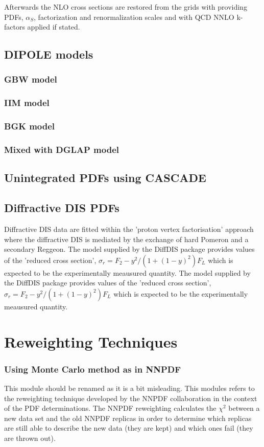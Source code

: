 \documentclass[11pt,a4paper]{article}
\begin{document}
Afterwards the NLO cross sections are restored from the grids
with providing PDFs, \(\alpha_S\), factorization and 
renormalization scales and with QCD NNLO k-factors applied
if stated.

\subsection{DIPOLE models}
\subsubsection{GBW model}
\subsubsection{IIM model}
\subsubsection{BGK model}
\subsubsection{Mixed with DGLAP model}
\subsection{Unintegrated PDFs using CASCADE}
\subsection{Diffractive DIS PDFs}
Diffractive DIS data are fitted within the 'proton vertex factorisation' approach where 
the diffractive DIS is mediated by the exchange of hard Pomeron and a secondary Reggeon.
The model supplied by the DiffDIS package provides values of the 'reduced cross section',
$\sigma_r = F_2 - y^2/(1+(1-y)^2) F_L$
which is expected to be the experimentally meausured quantity.
The model supplied by the DiffDIS package provides values of the 'reduced cross section',
$\sigma_r = F_2 - y^2/(1+(1-y)^2) F_L$
which is expected to be the experimentally meausured quantity.

\section{Reweighting Techniques}
\subsubsection{Using Monte Carlo method as in NNPDF}
This module should be renamed as it is a bit misleading.
This modules refers to the reweighting technique developed
by the NNPDF collaboration in the context of the PDF determinations.
The NNPDF reweighting calculates the $\chi^2$ between a new data set and the old NNPDF replicas in order to determine which replicas are still able to describe the new data (they are kept) and which ones fail (they are thrown out).
\end{document}
